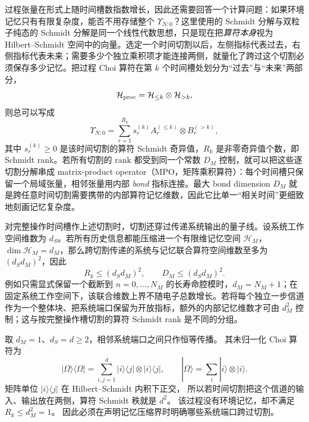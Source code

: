 过程张量在形式上随时间槽数指数增长，因此还需要回答一个计算问题：如果环境记忆只有有限复杂度，能否不用存储整个 $\Upsilon_{N:0}$？这里使用的 Schmidt 分解与双粒子纯态的 Schmidt 分解是同一个线性代数思想，只是现在把\emph{算符本身}视为 Hilbert--Schmidt 空间中的向量。选定一个时间切割以后，左侧指标代表过去，右侧指标代表未来；需要多少个独立乘积项才能连接两侧，就量化了跨过这个切割必须保存多少记忆。把过程 Choi 算符在第 $k$ 个时间槽处划分为“过去”与“未来”两部分，
\[
\mathcal H_{\rm proc}
=
\mathcal H_{\le k}\otimes\mathcal H_{>k},
\]
则总可以写成
\begin{equation}
\boxed{
\Upsilon_{N:0}
=
\sum_{r=1}^{R_k}
s_r^{(k)}
A_r^{(\le k)}
\otimes
B_r^{(>k)},}
\label{eq:process_tensor_temporal_schmidt}
\end{equation}
其中 $s_r^{(k)}\ge0$ 是该时间切割的算符 Schmidt 奇异值，$R_k$ 是非零奇异值个数，即 Schmidt rank。若所有切割的 rank 都受到同一个常数 $D_M$ 控制，就可以把这些逐切割分解串成 matrix-product operator（MPO，矩阵乘积算符）：每个时间槽只保留一个局域张量，相邻张量用内部 \emph{bond} 指标连接。最大 bond dimension $D_M$ 就是跨任意时间切割需要携带的内部算符记忆维数，因此它比单一“相关时间”更细致地刻画记忆复杂度。

对完整操作时间槽作上述切割时，切割还穿过传递系统输出的量子线。设系统工作空间维数为 $d_S$。若所有历史信息都能压缩进一个有限维记忆空间
$\mathcal H_M$，$\dim\mathcal H_M=d_M$，那么跨切割传递的系统与记忆联合算符空间维数至多为 $(d_Sd_M)^2$，因此
\begin{equation}
\boxed{
R_k\le (d_Sd_M)^2,
\qquad
D_M\le (d_Sd_M)^2.}
\label{eq:process_tensor_memory_bond_bound}
\end{equation}
例如只需显式保留一个截断到 $n=0,\ldots,N_M$ 的长寿命腔模时，$d_M=N_M+1$；在固定系统工作空间下，该联合维数上界不随电子总数增长。若将每个独立一步信道作为一个整体块、把系统端口保留为开放指标，额外的内部记忆维数才可由 $d_M^2$ 控制；这与按完整操作槽切割的算符 Schmidt rank 是不同的分组。

\begin{exbox}
取 $d_M=1$、$d_S=d\ge2$，相邻系统端口之间只作恒等传播。
其未归一化 Choi 算符为
\[
|\Omega\rangle\langle\Omega|
=\sum_{i,j=1}^{d}|i\rangle\langle j|\otimes|i\rangle\langle j|,
\qquad|\Omega\rangle=\sum_i|i\rangle\otimes|i\rangle.
\]
矩阵单位 $|i\rangle\langle j|$ 在 Hilbert--Schmidt 内积下正交，
所以若时间切割把这个信道的输入、输出放在两侧，算符 Schmidt 秩就是 $d^2$。
该过程没有环境记忆，却不满足 $R_k\le d_M^2=1$。
因此必须在声明记忆压缩界时明确哪些系统端口跨过切割。
\end{exbox}

